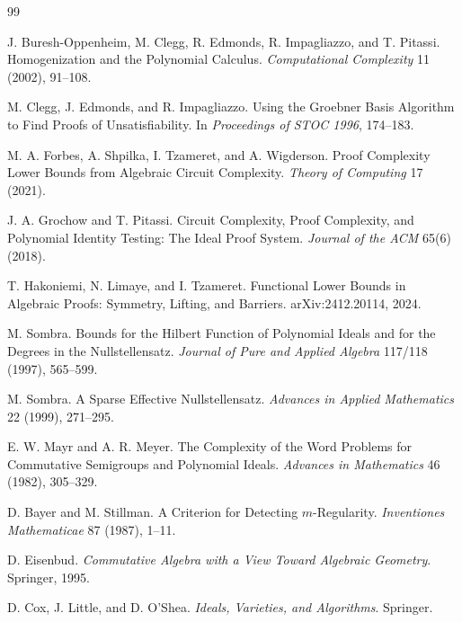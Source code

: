 \documentclass[11pt]{article}
\begin{document}
\begin{thebibliography}{99}

J. Buresh-Oppenheim, M. Clegg, R. Edmonds, R. Impagliazzo, and T. Pitassi.
\newblock Homogenization and the Polynomial Calculus.
\newblock \emph{Computational Complexity} 11 (2002), 91--108.

M. Clegg, J. Edmonds, and R. Impagliazzo.
\newblock Using the Groebner Basis Algorithm to Find Proofs of Unsatisfiability.
\newblock In \emph{Proceedings of STOC 1996}, 174--183.

M. A. Forbes, A. Shpilka, I. Tzameret, and A. Wigderson.
\newblock Proof Complexity Lower Bounds from Algebraic Circuit Complexity.
\newblock \emph{Theory of Computing} 17 (2021).

J. A. Grochow and T. Pitassi.
\newblock Circuit Complexity, Proof Complexity, and Polynomial Identity Testing: The Ideal Proof System.
\newblock \emph{Journal of the ACM} 65(6) (2018).

T. Hakoniemi, N. Limaye, and I. Tzameret.
\newblock Functional Lower Bounds in Algebraic Proofs: Symmetry, Lifting, and Barriers.
\newblock arXiv:2412.20114, 2024.

M. Sombra.
\newblock Bounds for the Hilbert Function of Polynomial Ideals and for the Degrees in the Nullstellensatz.
\newblock \emph{Journal of Pure and Applied Algebra} 117/118 (1997), 565--599.

M. Sombra.
\newblock A Sparse Effective Nullstellensatz.
\newblock \emph{Advances in Applied Mathematics} 22 (1999), 271--295.

E. W. Mayr and A. R. Meyer.
\newblock The Complexity of the Word Problems for Commutative Semigroups and Polynomial Ideals.
\newblock \emph{Advances in Mathematics} 46 (1982), 305--329.

D. Bayer and M. Stillman.
\newblock A Criterion for Detecting \(m\)-Regularity.
\newblock \emph{Inventiones Mathematicae} 87 (1987), 1--11.

D. Eisenbud.
\newblock \emph{Commutative Algebra with a View Toward Algebraic Geometry}.
\newblock Springer, 1995.

D. Cox, J. Little, and D. O'Shea.
\newblock \emph{Ideals, Varieties, and Algorithms}.
\newblock Springer.


\end{thebibliography}
\end{document}
